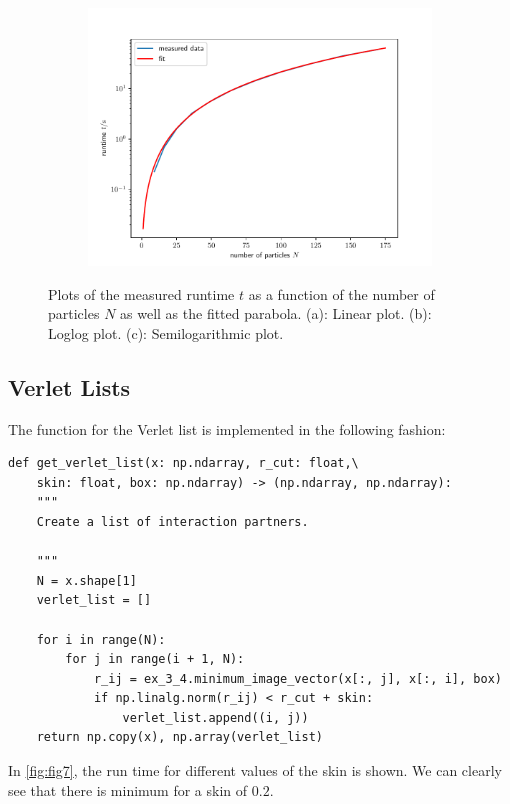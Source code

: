 \documentclass[a4paper,10pt,bibtotoc]{scrartcl}
\begin{document}
\begin{figure}
\begin{subfigure}[t]{.5\textwidth}
        \includegraphics[width=1\linewidth]{Fit3.pdf}
        \label{fig:sfig1}
    \end{subfigure}\hfill %
    \caption{Plots of the measured runtime $t$ as a function of the number of particles $N$ as well as the fitted parabola. (a): Linear plot. (b): Loglog plot. (c): Semilogarithmic plot.}
    \label{fig:fig6}
\end{figure}

\subsection{Verlet Lists}
The function for the Verlet list is implemented in the following fashion:
\begin{lstlisting}
def get_verlet_list(x: np.ndarray, r_cut: float,\
    skin: float, box: np.ndarray) -> (np.ndarray, np.ndarray):
    """
    Create a list of interaction partners.

    """
    N = x.shape[1]
    verlet_list = []

    for i in range(N):
        for j in range(i + 1, N):
            r_ij = ex_3_4.minimum_image_vector(x[:, j], x[:, i], box)
            if np.linalg.norm(r_ij) < r_cut + skin:
                verlet_list.append((i, j))
    return np.copy(x), np.array(verlet_list)
\end{lstlisting}
In \autoref{fig:fig7}, the run time for different values of the skin is shown. 
We can clearly see that there is minimum for a skin of $0.2$.
\end{document}
